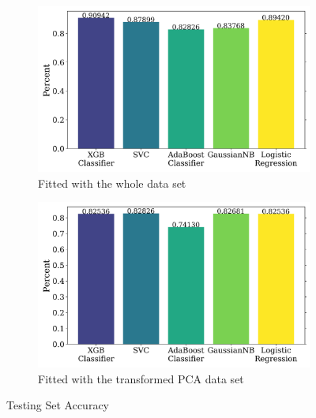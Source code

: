 \documentclass{article}
\begin{document}
\begin{figure}[H]
    \centering
    \begin{subfigure}[t]{0.495\textwidth}
        \centering
        \includegraphics[width=\textwidth]{test_acc_notpca.png}
        \caption{Fitted with the whole data set}
        \label{fig:test_acc_notpca}
    \end{subfigure}
    \hfill
    \begin{subfigure}[t]{0.495\textwidth}
        \centering
        \includegraphics[width=\textwidth]{test_acc_pca.png}
        \caption{Fitted with the transformed PCA data set}
        \label{fig:test_acc_pca}
    \end{subfigure}
    \caption{Testing Set Accuracy}
    \label{fig:test_acc}
\end{figure}
\end{document}
